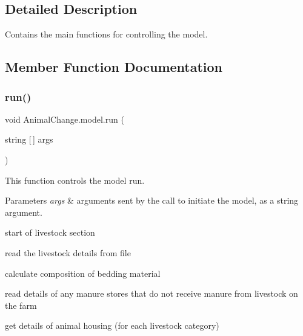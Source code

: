 \subsection{Detailed Description}
Contains the main functions for controlling the model. 

\subsection{Member Function Documentation}
\mbox{\label{class_animal_change_1_1model_adc89d4cffd48c182ee6496328e888727}} 
\subsubsection{\texorpdfstring{run()}{run()}}
{\footnotesize\ttfamily void Animal\+Change.\+model.\+run (\begin{DoxyParamCaption}\item[{string \mbox{[}$\,$\mbox{]}}]{args }\end{DoxyParamCaption})\hspace{0.3cm}{\ttfamily [inline]}}



This function controls the model run. 


\begin{DoxyParams}{Parameters}
{\em args} & arguments sent by the call to initiate the model, as a string argument. \\
\hline
\end{DoxyParams}
start of livestock section

read the livestock details from file

calculate composition of bedding material

read details of any manure stores that do not receive manure from livestock on the farm

get details of animal housing (for each livestock category) \mbox{\label{class_animal_change_1_1model_a8e454fd8dcd665b2e2531b499729dcae}} 
